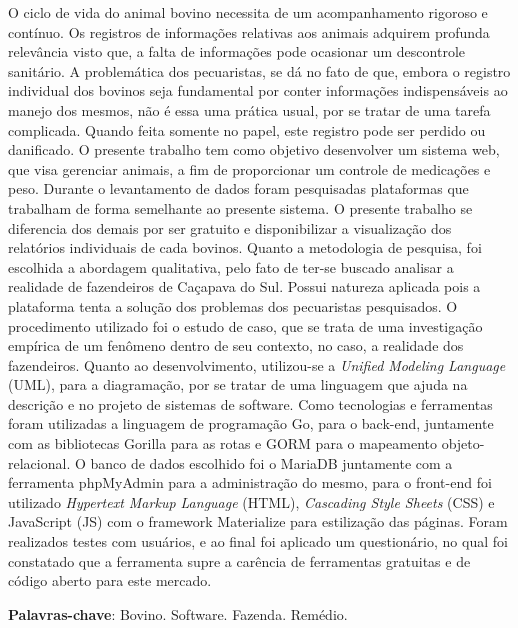 %
%

\begin{RESUMO}
\thispagestyle{empty}
	\begin{SingleSpace}

		\hspace{-1.2 cm}  O ciclo de vida do animal bovino necessita de um acompanhamento rigoroso e contínuo. Os registros de informações relativas aos animais adquirem profunda relevância visto que, a falta de informações pode ocasionar um descontrole sanitário. A problemática dos pecuaristas, se dá no fato de que, embora o registro individual dos bovinos seja fundamental por conter informações indispensáveis ao manejo dos mesmos, não é essa uma prática usual, por se tratar de uma tarefa  complicada. Quando feita somente no papel, este registro pode ser perdido ou danificado. O presente trabalho tem como objetivo desenvolver um sistema web, que visa gerenciar animais, a fim de proporcionar um controle de medicações e peso. Durante o levantamento de dados foram pesquisadas plataformas que trabalham de forma semelhante ao presente sistema. O presente trabalho se diferencia dos demais por ser gratuito e disponibilizar a visualização dos relatórios individuais de cada bovinos. Quanto a metodologia de pesquisa, foi escolhida a abordagem qualitativa, pelo fato de ter-se buscado analisar a realidade de fazendeiros de Caçapava do Sul. Possui natureza aplicada pois a plataforma tenta a solução dos problemas dos pecuaristas pesquisados. O procedimento utilizado foi o estudo de caso, que se trata de uma investigação empírica de um fenômeno dentro de seu contexto, no caso, a realidade dos fazendeiros. Quanto ao desenvolvimento, utilizou-se a \textit{Unified Modeling Language} (UML), para a diagramação, por se tratar de uma linguagem que ajuda na descrição e no projeto de sistemas de software. Como tecnologias e ferramentas foram utilizadas a linguagem de programação Go, para o back-end, juntamente com as bibliotecas Gorilla para as rotas e GORM para o mapeamento objeto-relacional. O banco de dados escolhido foi o MariaDB juntamente com a ferramenta phpMyAdmin para a administração do mesmo, para o front-end foi utilizado \textit{Hypertext Markup Language} (HTML), \textit{Cascading Style Sheets} (CSS) e JavaScript (JS) com o framework Materialize para estilização das páginas. Foram realizados testes com usuários, e ao final foi aplicado um questionário, no qual foi constatado que a ferramenta supre a carência de ferramentas gratuitas e de código aberto para este mercado.

		\vspace*{0.5cm}\hspace{-1.3 cm}\textbf{Palavras-chave}: Bovino. Software. Fazenda. Remédio.

	\end{SingleSpace}

\end{RESUMO}
